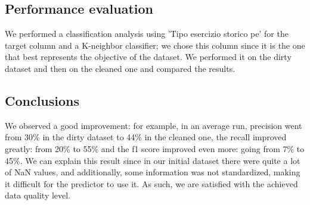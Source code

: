 \documentclass{article}
\begin{document}
\subsection{Performance evaluation}
We performed a classification analysis using 'Tipo esercizio storico pe' for the target column and a K-neighbor classifier; we chose this column since it is the one that best represents the objective of the dataset. We performed it on the dirty dataset and then on the cleaned one and compared the results.

\subsection{Conclusions}
We observed a good improvement: for example, in an average run, precision went from 30\% in the dirty dataset to 44\% in the cleaned one, the recall improved greatly: from 20\% to 55\% and the f1 score improved even more: going from 7\% to 45\%. We can explain this result since in our initial dataset there were quite a lot of NaN values, and additionally, some information was not standardized, making it difficult for the predictor to use it. As such, we are satisfied with the achieved data quality level. 
\end{document}
